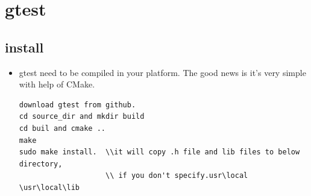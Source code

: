 \documentclass[a4paper,11pt,twoside]{book}
\begin{document}
\section{gtest}
\subsection{install}

\begin{itemize}
\item gtest need to be compiled in your platform. The good news is it's very simple with help of CMake. 
\begin{lstlisting}
download gtest from github.
cd source_dir and mkdir build
cd buil and cmake ..
make 
sudo make install.  \\it will copy .h file and lib files to below directory,
					\\ if you don't specify.usr\local \usr\local\lib
\end{lstlisting}	

\end{itemize}
\end{document}
